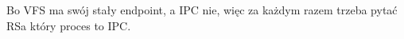 Bo VFS ma swój stały endpoint, a IPC nie, więc za każdym razem trzeba pytać RSa który proces to IPC.